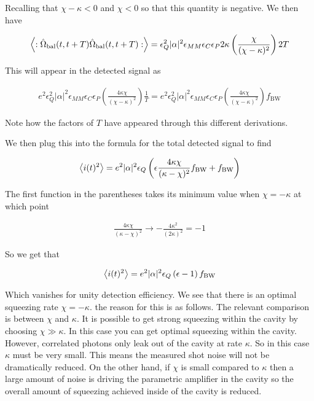 \documentclass[12pt]{article}
\begin{document}
Recalling that $\chi-\kappa <0$ and $\chi<0$ so that this quantity is negative. We then have

\begin{align}
\Braket{:\hat{\Omega}_{\text{bal}}(t,t+T) \hat{\Omega}_{\text{bal}}(t,t+T):} = \epsilon_Q^2 |\alpha|^2 \epsilon_{MM}\epsilon_C \epsilon_P 2\kappa \left(\frac{\chi}{(\chi-\kappa)^2}\right) 2T
\end{align}

This will appear in the detected signal as

\begin{align}
e^2 \epsilon_Q^2 |\alpha|^2 \epsilon_{MM}\epsilon_C \epsilon_P \left(\frac{4\kappa \chi}{(\chi-\kappa)^2}\right) \frac{1}{T} = e^2 \epsilon_Q^2 |\alpha|^2 \epsilon_{MM}\epsilon_C \epsilon_P \left(\frac{4\kappa \chi}{(\chi-\kappa)^2}\right) f_{\text{BW}}
\end{align}

Note how the factors of $T$ have appeared through this different derivations.

We then plug this into the formula for the total detected signal to find

\begin{align}
\Braket{i(t)^2} = e^2 |\alpha|^2 \epsilon_Q \left( \epsilon \frac{4\kappa \chi}{(\kappa-\chi)^2} f_{\text{BW}} + f_{\text{BW}} \right)
\end{align}

The first function in the parentheses takes its minimum value when $\chi = -\kappa$ at which point

\begin{align}
\frac{4\kappa \chi}{(\kappa-\chi)^2} \rightarrow -\frac{4\kappa^2}{(2\kappa)^2} = -1
\end{align}

So we get that

\begin{align}
\Braket{i(t)^2} = e^2|\alpha|^2\epsilon_Q\left(\epsilon - 1 \right)f_{\text{BW}}
\end{align}

Which vanishes for unity detection efficiency. We see that there is an optimal squeezing rate $\chi = -\kappa$. the reason for this is as follows. The relevant comparison is between $\chi$ and $\kappa$. It is possible to get strong squeezing within the cavity by choosing $\chi \gg \kappa$. In this case you can get optimal squeezing within the cavity. However, correlated photons only leak out of the cavity at rate $\kappa$. So in this case $\kappa$ must be very small. This means the measured shot noise will not be dramatically reduced. On the other hand, if $\chi$ is small compared to $\kappa$ then a large amount of noise is driving the parametric amplifier in the cavity so the overall amount of squeezing achieved inside of the cavity is reduced.
\end{document}
